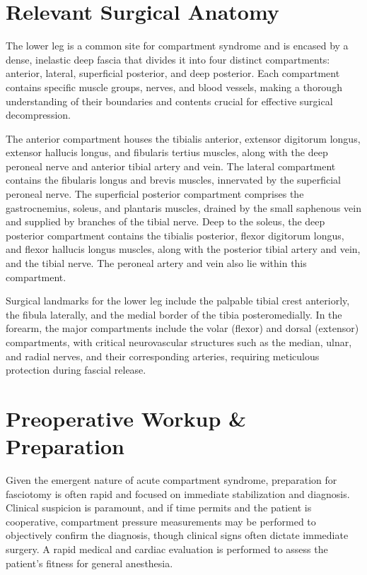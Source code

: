 \section*{Relevant Surgical Anatomy}
The lower leg is a common site for compartment syndrome and is encased by a dense, inelastic deep fascia that divides it into four distinct compartments: anterior, lateral, superficial posterior, and deep posterior. Each compartment contains specific muscle groups, nerves, and blood vessels, making a thorough understanding of their boundaries and contents crucial for effective surgical decompression.

The anterior compartment houses the tibialis anterior, extensor digitorum longus, extensor hallucis longus, and fibularis tertius muscles, along with the deep peroneal nerve and anterior tibial artery and vein. The lateral compartment contains the fibularis longus and brevis muscles, innervated by the superficial peroneal nerve. The superficial posterior compartment comprises the gastrocnemius, soleus, and plantaris muscles, drained by the small saphenous vein and supplied by branches of the tibial nerve. Deep to the soleus, the deep posterior compartment contains the tibialis posterior, flexor digitorum longus, and flexor hallucis longus muscles, along with the posterior tibial artery and vein, and the tibial nerve. The peroneal artery and vein also lie within this compartment.

Surgical landmarks for the lower leg include the palpable tibial crest anteriorly, the fibula laterally, and the medial border of the tibia posteromedially. In the forearm, the major compartments include the volar (flexor) and dorsal (extensor) compartments, with critical neurovascular structures such as the median, ulnar, and radial nerves, and their corresponding arteries, requiring meticulous protection during fascial release.

\section*{Preoperative Workup \& Preparation}
Given the emergent nature of acute compartment syndrome, preparation for fasciotomy is often rapid and focused on immediate stabilization and diagnosis. Clinical suspicion is paramount, and if time permits and the patient is cooperative, compartment pressure measurements may be performed to objectively confirm the diagnosis, though clinical signs often dictate immediate surgery. A rapid medical and cardiac evaluation is performed to assess the patient's fitness for general anesthesia.

